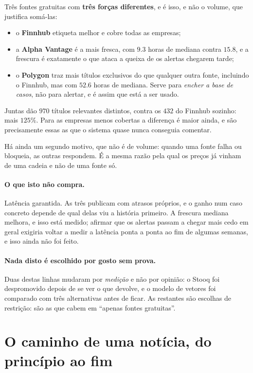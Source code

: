 Três fontes gratuitas com \textbf{três forças diferentes}, e é isso, e não o volume, que justifica
somá-las:

\begin{itemize}
  \item o \textbf{Finnhub} etiqueta melhor e cobre todas as empresas;
  \item a \textbf{Alpha Vantage} é a mais fresca, com $9.3$ horas de mediana contra $15.8$, e a
        frescura é exatamente o que ataca a queixa de os alertas chegarem tarde;
  \item o \textbf{Polygon} traz mais títulos exclusivos do que qualquer outra fonte, incluindo o
        Finnhub, mas com $52.6$ horas de mediana. Serve para \emph{encher a base de casos}, não
        para alertar, e é assim que está a ser usado.
\end{itemize}

Juntas dão \textbf{$970$} títulos relevantes distintos, contra os $432$ do Finnhub sozinho: mais
$125\%$. Para as empresas menos cobertas a diferença é maior ainda, e são precisamente essas as que
o sistema quase nunca conseguia comentar.

Há ainda um segundo motivo, que não é de volume: quando uma fonte falha ou bloqueia, as outras
respondem. É a mesma razão pela qual os preços já vinham de uma cadeia e não de uma fonte só.

\paragraph{O que isto não compra.}
Latência garantida. As três publicam com atrasos próprios, e o ganho num caso concreto depende de
qual delas viu a história primeiro. A frescura mediana melhora, e isso está medido; afirmar que os
alertas passam a chegar mais cedo em geral exigiria voltar a medir a latência ponta a ponta ao fim
de algumas semanas, e isso ainda não foi feito.

\paragraph{Nada disto é escolhido por gosto sem prova.}
Duas destas linhas mudaram por \emph{medição} e não por opinião: o Stooq foi despromovido depois de
se ver o que devolve, e o modelo de vetores foi comparado com três alternativas antes de ficar. As
restantes são escolhas de restrição: são as que cabem em ``apenas fontes gratuitas''.

\section{O caminho de uma notícia, do princípio ao fim}
\label{sec:sis_caminho}

